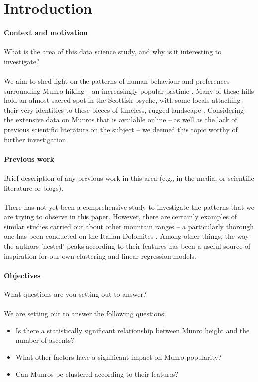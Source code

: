 \documentclass[11pt,a4paper]{article}
\begin{document}
\section{Introduction}

\paragraph{Context and motivation}

What is the area of this data science study, and why is it interesting
to investigate? \\ \\
We aim to shed light on the patterns of human behaviour and preferences surrounding Munro hiking – an increasingly popular pastime \cite{CSM}. Many of these hills hold an almost sacred spot in the Scottish psyche, with some locals attaching their very identities to these pieces of timeless, rugged landscape \cite{HAE}. Considering the extensive data on Munros that is available online – as well as the lack of previous scientific literature on the subject – we deemed this topic worthy of further investigation.

\paragraph{Previous work}

Brief description of any previous work in this area (e.g., in the
media, or scientific literature or blogs). \\ \\
There has not yet been a comprehensive study to investigate the patterns that we are trying to observe in this paper. However, there are certainly examples of similar studies carried out about other mountain ranges – a particularly thorough one has been conducted on the Italian Dolomites \cite{HitA}. Among other things, the way the authors 'nested' peaks according to their features has been a useful source of inspiration for our own clustering and linear regression models. 

\paragraph{Objectives}

What questions are you setting out to answer? \\ \\
We are setting out to answer the following questions:
\begin{itemize}
    \item Is there a statistically significant relationship between Munro height and the number of ascents?
    \item What other factors have a significant impact on Munro popularity?
    \item Can Munros be clustered according to their features?
\end{itemize}
\end{document}
